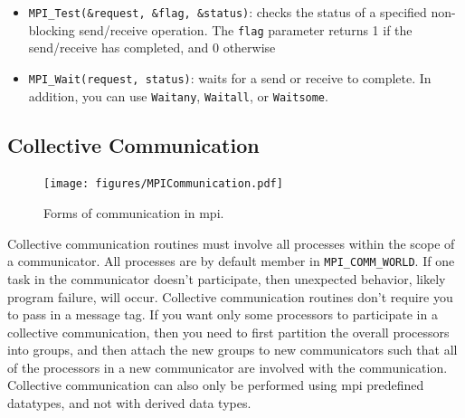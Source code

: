 \documentclass[10pt]{article}
\begin{document}
\begin{flushleft}
\begin{itemize}
\item {\tt MPI_Test(\&request, \&flag, \&status)}: checks the status of a specified non-blocking send/receive operation. The {\tt flag} parameter returns 1 if the send/receive has completed, and 0 otherwise
\item {\tt MPI\_Wait(request, status)}: waits for a send or receive to complete. In addition, you can use {\tt Waitany}, {\tt Waitall}, or {\tt Waitsome}.
\end{itemize}

\subsection{Collective Communication}

\begin{figure}[H]
\centering
\texttt{[image: figures/MPICommunication.pdf]}
\caption{Forms of communication in \gls{mpi}.}
\end{figure}

Collective communication routines must involve all processes within the scope of a communicator. All processes are by default member in {\tt MPI\_COMM\_WORLD}. If one task in the communicator doesn't participate, then unexpected behavior, likely program failure, will occur. Collective communication routines don't require you to pass in a message tag. If you want only some processors to participate in a collective communication, then you need to first partition the overall processors into groups, and then attach the new groups to new communicators such that all of the processors in a new communicator are involved with the communication. Collective communication can also only be performed using \gls{mpi} predefined datatypes, and not with derived data types. 


\end{flushleft}
\end{document}
